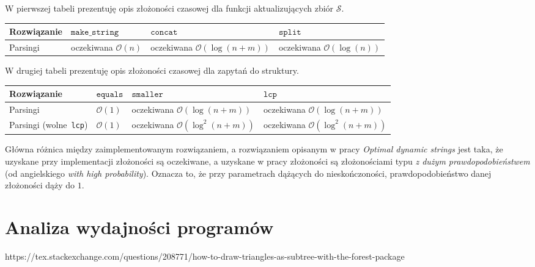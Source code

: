 \documentclass[declaration,shortabstract]{iithesis}
\theoremstyle{definition} \newtheorem{definition}{Definicja}[chapter]
\theoremstyle{remark} \newtheorem{remark}[definition]{Obserwacja}
\theoremstyle{plain} \newtheorem{theorem}[definition]{Twierdzenie}
\theoremstyle{remark} \newtheorem{example}{Przykład}[definition]
\theoremstyle{plain} \newtheorem{lemma}[definition]{Lemat}
\begin{document}
W pierwszej tabeli prezentuję opis złożoności czasowej dla funkcji aktualizujących zbiór $\mathcal{S}$.

\begin{center}
    \begin{tabular}{ | m{3cm} | >{\centering\arraybackslash}m{3cm} | >{\centering\arraybackslash}m{3cm} | >{\centering\arraybackslash}m{3cm} | }
        \hline 
        Rozwiązanie & $\texttt{make\_string}$ & $\texttt{concat}$ & $\texttt{split}$ \\
        \hline
        Parsingi & oczekiwana $\mathcal{O}(n)$ & oczekiwana $\mathcal{O}(\log(n + m))$ & oczekiwana $\mathcal{O}(\log(n))$ \\
        \hline
    \end{tabular}
\end{center}

W drugiej tabeli prezentuję opis złożoności czasowej dla zapytań do struktury.

\begin{center}
    \begin{tabular}{ | m{3cm} | >{\centering\arraybackslash}m{3cm} | >{\centering\arraybackslash}m{3cm} | >{\centering\arraybackslash}m{3cm} | }
        \hline 
        Rozwiązanie & $\texttt{equals}$ & $\texttt{smaller}$ & $\texttt{lcp}$ \\
        \hline
        Parsingi & $\mathcal{O}(1)$ & oczekiwana $\mathcal{O}(\log(n + m))$ & oczekiwana $\mathcal{O}(\log(n + m))$ \\
        \hline
        Parsingi (wolne~\texttt{lcp}) & $\mathcal{O}(1)$ & oczekiwana $\mathcal{O}(\log^2(n + m))$ & oczekiwana $\mathcal{O}(\log^2(n + m))$ \\
        \hline
    \end{tabular}
\end{center}

Główna różnica między zaimplementowanym rozwiązaniem, a rozwiązaniem opisanym w pracy \textit{Optimal dynamic strings} jest taka, że uzyskane przy implementacji złożoności są oczekiwane, a uzyskane w pracy złożoności są złożonościami typu \textit{z dużym prawdopodobieństwem} (od angielskiego \textit{with high probability}). Oznacza to, że przy parametrach dążących do nieskończoności, prawdopodobieństwo danej złożoności dąży do $1$.

\chapter{Analiza wydajności programów}

\begin{thebibliography}{1}
 https://tex.stackexchange.com/questions/208771/how-to-draw-triangles-as-subtree-with-the-forest-package
\end{thebibliography}
\end{document}
